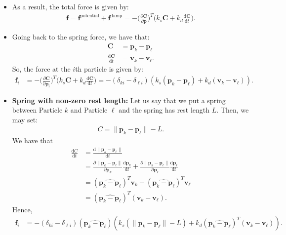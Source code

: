 \documentclass[10pt]{article}
\newcommand{\dee}{\mathrm{d}}
\newcommand{\ve}[1]{\mathbf{#1}}
\begin{document}
\begin{itemize}
    \item As a result, the total force is given by:
    \begin{align*}
      \ve{f}
      = \ve{f}^{\mathrm{potential}} + \ve{f}^{\mathrm{damp}}
      = -\bigg( \frac{\partial \ve{C}}{\partial \ve{p}} \bigg)^T\bigg( k_s\ve{C} + k_d \frac{\dee \ve{C}}{\dee t} \bigg).
    \end{align*}

    \item Going back to the spring force, we have that:
    \begin{align*}
      \ve{C} &= \ve{p}_k - \ve{p}_\ell \\
      \frac{\dee \ve{C}}{\dee t} &= \ve{v}_k - \ve{v}_\ell.
    \end{align*}
    So, the force at the $i$th particle is given by:
    \begin{align*}
      \ve{f}_i 
      &= -\bigg( \frac{\partial \ve{C}}{\partial \ve{p}_i} \bigg)^T\bigg( k_s\ve{C} + k_d \frac{\dee \ve{C}}{\dee t} \bigg)
      = - (\delta_{ki} - \delta_{\ell i}) (k_s(\ve{p}_k - \ve{p}_\ell) + k_d (\ve{v}_k - \ve{v}_\ell)).
    \end{align*}

    \item {\bf Spring with non-zero rest length:} Let us say that we put a spring between Particle $k$ and Particle $\ell$ and the spring has rest length $L$. Then, we may set:
    \begin{align*}
      C = \| \ve{p}_k - \ve{p}_\ell \| - L.      
    \end{align*}
    We have that
    \begin{align*}
      \frac{\dee C}{\dee t} 
      &= \frac{\dee \| \ve{p}_k - \ve{p}_\ell \|}{\dee t}\\
      &= \frac{\partial \| \ve{p}_k - \ve{p}_\ell \|}{\partial \ve{p}_k} \frac{\dee \ve{p}_k}{\dee t} + \frac{\partial \| \ve{p}_k - \ve{p}_\ell \|}{\partial \ve{p}_\ell} \frac{\dee \ve{p}_\ell}{\dee t}\\
      &= (\widehat{\ve{p}_k - \ve{p}_\ell})^T\ve{v}_k - (\widehat{\ve{p}_k - \ve{p}_\ell})^T\ve{v}_\ell\\
      &= (\widehat{\ve{p}_k - \ve{p}_\ell})^T (\ve{v}_k - \ve{v}_\ell).
    \end{align*}
    Hence,
    \begin{align*}
      \ve{f}_i
      &= - (\delta_{ki} - \delta_{\ell i}) (\widehat{\ve{p}_k - \ve{p}_\ell}) (k_s (\| \ve{p}_k - \ve{p}_\ell \| - L) + k_d (\widehat{\ve{p}_k - \ve{p}_\ell})^T (\ve{v}_k - \ve{v}_\ell)).
    \end{align*}        
  \end{itemize}
    
\end{document}
